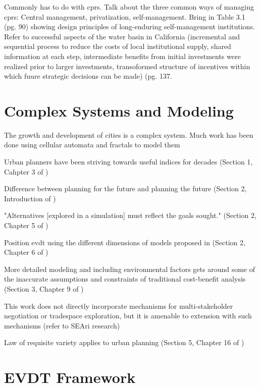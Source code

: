 Commonly has to do with \acp{cpr}. Talk about the three common ways of managing \acp{cpr}: Central management, privatization, self-management. Bring in Table 3.1 (pg. 90) showing design principles of long-enduring self-management institutions. Refer to successful aspects of the water basin in California (incremental and sequential process to reduce the costs of local institutional supply, shared information at each step, intermediate benefits from initial investments were realized prior to larger investments, transoformed structure of incentives within which fuure strategic decisions can be made) (pg. 137. \cite{ostromGoverningCommonsEvolution2015}

\section{Complex Systems and Modeling}

The growth and development of cities is a complex system. Much work has been done using cellular automata and fractals to model them \cite{battyCitiesComplexity2005}

Urban planners have been striving towards useful indices for decades (Section 1, Cahpter 3 of \cite{robinsonDecisionmakingUrbanPlanning1972})

Difference between planning for the future and planning the future (Section 2, Introduction of \cite{robinsonDecisionmakingUrbanPlanning1972})

"Alternatives [explored in a simulation] must reflect the goals sought." (Section 2, Chapter 5 of \cite{robinsonDecisionmakingUrbanPlanning1972})

Position \ac{evdt} using the different dimensions of models proposed in (Section 2, Chapter 6 of \cite{robinsonDecisionmakingUrbanPlanning1972})

More detailed modeling and including environmental factors gets around some of the inaccurate assumptions and constraints of traditional cost-benefit analysis (Section 3, Chapter 9 of \cite{robinsonDecisionmakingUrbanPlanning1972})


This work does not directly incorporate mechanisms for multi-stakeholder negotiation or tradespace exploration, but it is amenable to extension with such mechanisms (refer to SEAri research)

Law of requisite variety applies to urban planning (Section 5, Chapter 16 of \cite{robinsonDecisionmakingUrbanPlanning1972})


\section{EVDT Framework}

